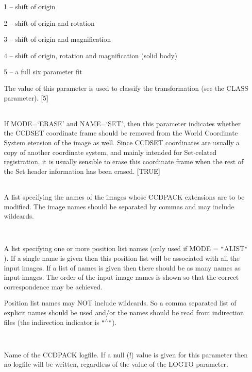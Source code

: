 \documentclass[twoside,11pt]{article}
\renewcommand{\_}{\texttt{\symbol{95}}}
\newcommand{\qt}[1]{{\tt "}#1{\tt "}}
\newcommand{\sstsubsection}[1]{ \item[{#1}] \mbox{} \\}
\newcommand{\sstitem}{\item}
\newcommand{\sstsubsection}[1]{\item[{#1}]}
\newcommand{\sstitem}{\item}
\begin{document}
{{{{            \sstitem
               1 -- shift of origin

            \sstitem
               2 -- shift of origin and rotation

            \sstitem
               3 -- shift of origin and magnification

            \sstitem
               4 -- shift of origin, rotation and magnification
                      (solid body)

            \sstitem
               5 -- a full six parameter fit

         }
         The value of this parameter is used to classify the
         transformation (see the CLASS parameter).
         [5]
      }
      \sstsubsection{
         FIXWCS = \_LOGICAL (Read)
      }{
         If MODE=`ERASE' and NAME=`SET', then this parameter indicates
         whether the CCD\_SET coordinate frame should be removed from
         the World Coordinate System etension of the image as well.
         Since CCD\_SET coordinates are usually a copy of another
         coordinate system, and mainly intended for Set-related 
         registration, it is usually sensible to erase this coordinate
         frame when the rest of the Set header information has
         been erased.
         [TRUE]
      }
      \sstsubsection{
         IN = IMAGE (Read)
      }{
         A list specifying the names of the images whose CCDPACK
         extensions are to be modified. The image names should be
         separated by commas and may include wildcards.
      }
      \sstsubsection{
         INLIST = LITERAL (Read)
      }{
         A list specifying one or more position list names (only used
         if MODE = \qt{ALIST} ). If a single name is given then this
         position list will be associated with all the input images. If
         a list of names is given then there should be as many names
         as input images. The order of the input image names is shown so
         that the correct correspondence may be achieved.

         Position list names may NOT include wildcards. So a comma
         separated list of explicit names should be used and/or the
         names should be read from indirection files (the indirection
         indicator is \qt{$^\wedge$}).
      }
      \sstsubsection{
         LOGFILE = FILENAME (Read)
      }{
         Name of the CCDPACK logfile.  If a null (!) value is given for
         this parameter then no logfile will be written, regardless of
         the value of the LOGTO parameter.

}}}
\end{document}

